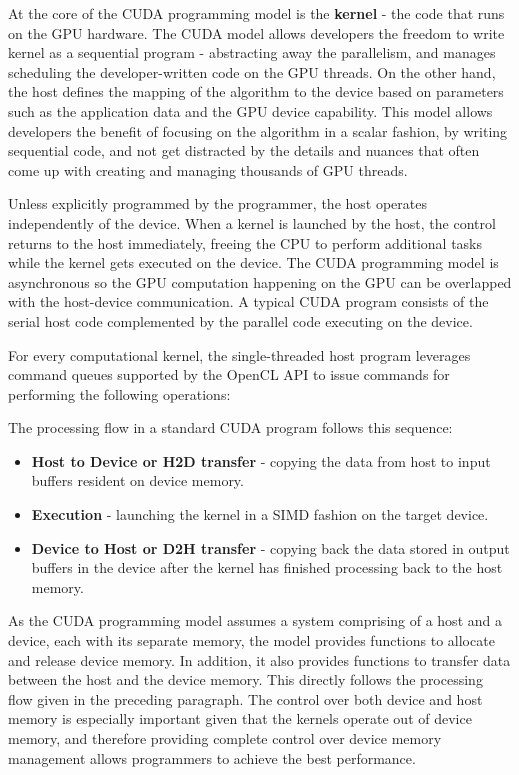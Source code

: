 At the core of the CUDA programming model is the \textbf{kernel} - the code that runs on the GPU hardware. The CUDA model allows developers the freedom to write kernel as a sequential program - abstracting away the parallelism, and manages scheduling the developer-written code on the GPU threads. On the other hand, the host defines the mapping of the algorithm to the device based on parameters such as the application data and the GPU device capability. This model allows developers the benefit of focusing on the algorithm in a scalar fashion, by writing sequential code, and not get distracted by the details and nuances that often come up with creating and managing thousands of GPU threads.


Unless explicitly programmed by the programmer, the host operates independently of the device. When a kernel is launched by the host, the control returns to the host immediately, freeing the CPU to perform additional tasks while the kernel gets executed on the device. The CUDA programming model is asynchronous so the GPU computation happening on the GPU can be overlapped with the host-device communication.  A typical CUDA program consists of the serial host code complemented by the parallel code executing on the device. 

For every computational kernel, the single-threaded host program leverages command queues supported by the OpenCL API to issue commands for  performing the following operations: 

The processing flow in a standard CUDA program follows this sequence:
\begin{itemize}
	\item \textbf{Host to Device or H2D transfer} - copying the data from host to input buffers resident on device memory. 
	\item \textbf{Execution} - launching the kernel in a SIMD fashion on the target device.
	\item \textbf{Device to Host or D2H transfer} - copying back the data stored in output buffers in the device after the kernel has finished processing back to the host memory.
\end{itemize}

As the CUDA programming model assumes a system comprising of a host and a device, each with its separate memory, the model provides functions to allocate and release device memory. In addition, it also provides functions to transfer data between the host and the device memory. This directly follows the processing flow given in the preceding paragraph. The control over both device and host memory is especially important given that the kernels operate out of device memory, and therefore providing complete control over device memory management allows programmers to achieve the best performance.

